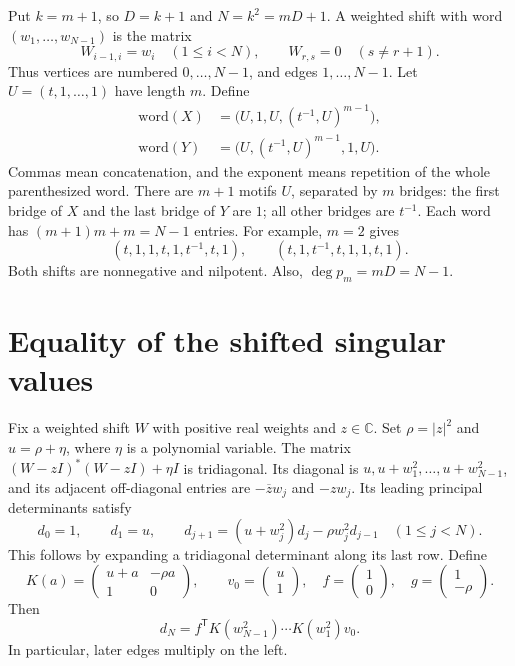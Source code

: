 \documentclass[11pt,a4paper]{article}
\begin{document}
Put $k=m+1$, so $D=k+1$ and $N=k^2=mD+1$.
A weighted shift with word $(w_1,\ldots,w_{N-1})$ is the matrix
\[
 W_{i-1,i}=w_i\quad(1\le i<N),\qquad W_{r,s}=0\quad(s\ne r+1).
\]
Thus vertices are numbered $0,\ldots,N-1$, and edges $1,\ldots,N-1$.
Let $U=(t,1,\ldots,1)$ have length $m$. Define
\begin{equation}\label{eq:words}
 \begin{aligned}
 \text{word}(X)&=\bigl(U,1,U,(t^{-1},U)^{m-1}\bigr),\\
 \text{word}(Y)&=\bigl(U,(t^{-1},U)^{m-1},1,U\bigr).
 \end{aligned}
\end{equation}
Commas mean concatenation, and the exponent means repetition of the whole
parenthesized word. There are $m+1$ motifs $U$, separated by $m$ bridges:
the first bridge of $X$ and the last bridge of $Y$ are $1$; all other
bridges are $t^{-1}$. Each word has $(m+1)m+m=N-1$ entries.
For example, $m=2$ gives
\[
 (t,1,1,t,1,t^{-1},t,1),\qquad
 (t,1,t^{-1},t,1,1,t,1).
\]
Both shifts are nonnegative and nilpotent. Also, $\deg p_m=mD=N-1$.

\section{Equality of the shifted singular values}
Fix a weighted shift $W$ with positive real weights and $z\in\mathbb C$. Set
$\rho=|z|^2$ and $u=\rho+\eta$, where $\eta$ is a polynomial variable.
The matrix $(W-zI)^*(W-zI)+\eta I$ is tridiagonal. Its diagonal is
$u,u+w_1^2,\ldots,u+w_{N-1}^2$, and its adjacent off-diagonal entries
are $-\overline z w_j$ and $-z w_j$. Its leading principal determinants satisfy
\begin{equation}\label{eq:recurrence}
 d_0=1,\qquad d_1=u,\qquad
 d_{j+1}=(u+w_j^2)d_j-\rho w_j^2d_{j-1}\quad(1\le j<N).
\end{equation}
This follows by expanding a tridiagonal determinant along its last row.
Define
\begin{equation}\label{eq:K}
 K(a)=\begin{pmatrix}u+a&-\rho a\\1&0\end{pmatrix},\qquad
 v_0=\begin{pmatrix}u\\1\end{pmatrix},\quad
 f=\begin{pmatrix}1\\0\end{pmatrix},\quad
 g=\begin{pmatrix}1\\-\rho\end{pmatrix}.
\end{equation}
Then
\begin{equation}\label{eq:product}
 d_N=f^{\mathsf T}K(w_{N-1}^2)\cdots K(w_1^2)v_0.
\end{equation}
In particular, later edges multiply on the left.
\end{document}
